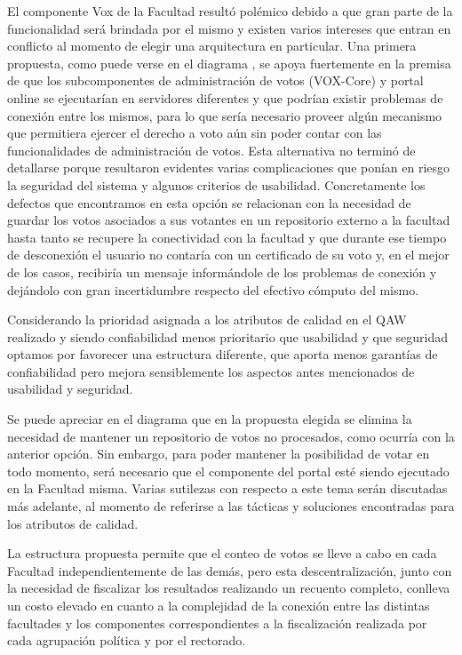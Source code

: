 El componente Vox de la Facultad resultó polémico debido a que gran parte de la funcionalidad será brindada por el mismo y existen varios intereses que entran en conflicto al momento de elegir una arquitectura en particular. Una primera propuesta, como puede verse en el diagrama %
, se apoya fuertemente en la premisa de que los subcomponentes de administración de votos (VOX-Core) y portal online se ejecutarían en servidores diferentes y que podrían existir problemas de conexión entre los mismos, para lo que sería necesario proveer algún mecanismo que permitiera ejercer el derecho a voto aún sin poder contar con las funcionalidades de administración de votos. Esta alternativa no terminó de detallarse porque resultaron evidentes varias complicaciones que ponían en riesgo la seguridad del sistema y algunos criterios de usabilidad. Concretamente los defectos que encontramos en esta opción se relacionan con la necesidad de guardar los votos asociados a sus votantes en un repositorio externo a la facultad hasta tanto se recupere la conectividad con la facultad y que durante ese tiempo de desconexión el usuario no contaría con un certificado de su voto y, en el mejor de los casos, recibiría un mensaje informándole de los problemas de conexión y dejándolo con gran incertidumbre respecto del efectivo cómputo del mismo.


Considerando la prioridad asignada a los atributos de calidad en el QAW realizado y siendo confiabilidad menos prioritario que usabilidad y que seguridad optamos por favorecer una estructura diferente, que aporta menos garantías de confiabilidad pero mejora sensiblemente los aspectos antes mencionados de usabilidad y seguridad.

Se puede apreciar en el diagrama %
que en la propuesta elegida se elimina la necesidad de mantener un repositorio de votos no procesados, como ocurría con la anterior opción. Sin embargo, para poder mantener la posibilidad de votar en todo momento, será necesario que el componente del portal esté siendo ejecutado en la Facultad misma. Varias sutilezas con respecto a este tema serán discutadas más adelante, al momento de referirse a las tácticas y soluciones encontradas para los atributos de calidad.


La estructura propuesta permite que el conteo de votos se lleve a cabo en cada Facultad independientemente de las demás, pero esta descentralización, junto con la necesidad de fiscalizar los resultados realizando un recuento completo, conlleva un costo elevado en cuanto a la complejidad de la conexión entre las distintas facultades y los componentes correspondientes a la fiscalización realizada por cada agrupación política y por el rectorado.

